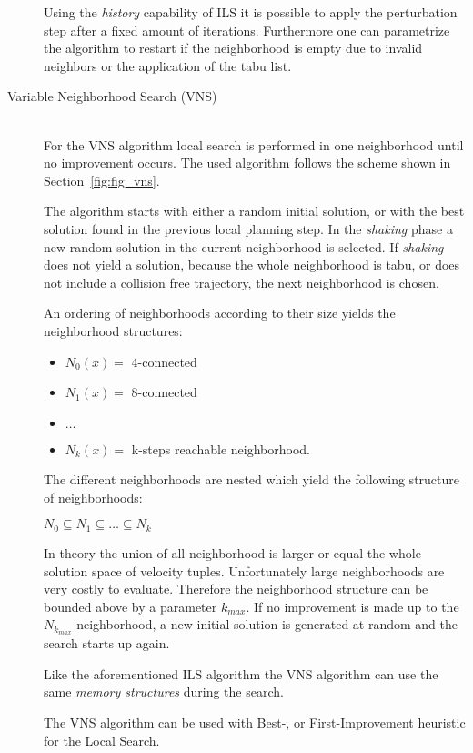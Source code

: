 \begin{description}
Using the \emph{history} capability of ILS it is possible to apply the perturbation step after a fixed amount of iterations. 
Furthermore one can parametrize the algorithm to restart if the neighborhood is empty due to invalid neighbors or the application of the tabu list. 


\item[Variable Neighborhood Search (VNS)]\hfill \\
For the VNS algorithm local search is performed in one neighborhood until no improvement occurs.
The used algorithm follows the scheme shown in Section~\ref{fig:fig_vns}.

The algorithm starts with either a random initial solution, or with the best solution found in the previous local planning step. 
In the \emph{shaking} phase a new random solution in the current neighborhood is selected. 
If \emph{shaking} does not yield a solution, because the whole neighborhood is tabu, or does not include a collision free trajectory, the next neighborhood is chosen. 

An ordering of neighborhoods according to their size yields the neighborhood structures:
\begin{itemize}
 \item $N_0(x)=$ 4-connected
 \item $N_1(x)=$ 8-connected
 \item $\dots$
 \item $N_k(x)=$ k-steps reachable neighborhood.
\end{itemize}
The different neighborhoods are nested which yield the following structure of neighborhoods:

$N_0 \subseteq N_1 \subseteq \dots \subseteq N_k$

In theory the union of all neighborhood is larger or equal the whole solution space of velocity tuples.
Unfortunately large neighborhoods are very costly to evaluate. 
Therefore the neighborhood structure can be bounded above by a parameter $k_{max}$.
If no improvement is made up to the $N_{k_{max}}$ neighborhood, a new initial solution is generated at random and the search starts up again.

Like the aforementioned ILS algorithm the VNS algorithm can use the same \emph{memory structures} during the search.

The VNS algorithm can be used with Best-, or First-Improvement heuristic for the Local Search.
\end{description}




